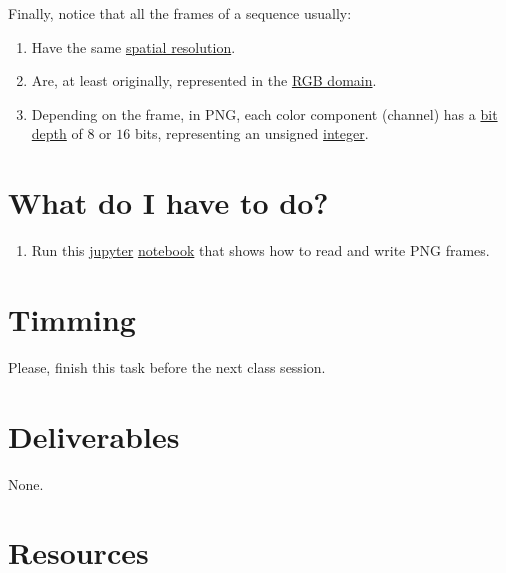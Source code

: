 Finally, notice that all the frames of a sequence usually:
\begin{enumerate}
\item Have the same
  \href{https://en.wikipedia.org/wiki/Image_resolution}{spatial
    resolution}.
\item Are, at least originally, represented in the
  \href{https://en.wikipedia.org/wiki/RGB_color_model}{RGB domain}.
\item Depending on the frame, in PNG, each color component (channel) has a
  \href{https://en.wikipedia.org/wiki/Glossary_of_computer_graphics#bit_depth}{bit
    depth} of $8$ or $16$ bits, representing an unsigned
  \href{https://en.wikipedia.org/wiki/Integer_(computer_science)}{integer}.
\end{enumerate}
  
\section{What do I have to do?}

\begin{enumerate}
\item Run this \href{https://jupyter.org/}{jupyter}
  \href{https://github.com/Sistemas-Multimedia/Sistemas-Multimedia.github.io/blob/master/contents/PNG/display_video.ipynb}{notebook}
  that shows how to read and write PNG frames.
\end{enumerate}

\section{Timming}

Please, finish this task before the next class session.

\section{Deliverables}

None.

\section{Resources}

\renewcommand{\addcontentsline}[3]{}%

